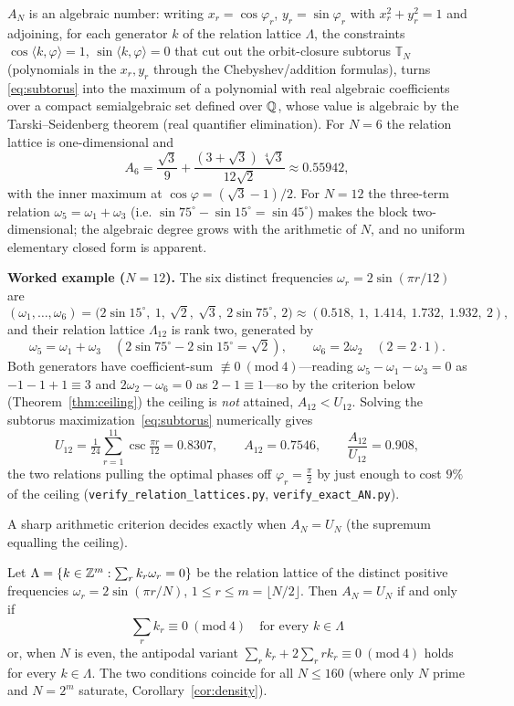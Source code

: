 \begin{proposition}\label{prop:closed}
$A_N$ is an algebraic number: writing $x_r=\cos\varphi_r$, $y_r=\sin\varphi_r$ with $x_r^2+y_r^2=1$ and
adjoining, for each generator $k$ of the relation lattice $\Lambda$, the constraints
$\cos\langle k,\varphi\rangle=1$, $\sin\langle k,\varphi\rangle=0$ that cut out the orbit-closure subtorus
$\mathbb{T}_N$ (polynomials in the $x_r,y_r$ through the Chebyshev/addition formulas), turns
\eqref{eq:subtorus} into the maximum of a polynomial with real algebraic coefficients over a compact
semialgebraic set defined over $\mathbb{Q}$, whose value is algebraic by the Tarski--Seidenberg theorem (real quantifier elimination). For $N=6$ the relation lattice is one-dimensional and
\[
  A_6=\frac{\sqrt3}{9}+\frac{(3+\sqrt3)\,\sqrt[4]{3}}{12\sqrt2}\approx0.55942 ,
\]
with the inner maximum at $\cos\varphi=(\sqrt3-1)/2$. For $N=12$ the three-term relation
$\omega_5=\omega_1+\omega_3$ (i.e. $\sin75^\circ-\sin15^\circ=\sin45^\circ$) makes the block
two-dimensional; the algebraic degree grows with the arithmetic of $N$, and no uniform elementary
closed form is apparent.
\end{proposition}

\medskip\noindent\textbf{Worked example ($N=12$).} The six distinct frequencies $\omega_r=2\sin(\pi r/12)$
are
\[
  (\omega_1,\dots,\omega_6)=\bigl(2\sin15^\circ,\ 1,\ \sqrt2,\ \sqrt3,\ 2\sin75^\circ,\ 2\bigr)
  \approx(0.518,\ 1,\ 1.414,\ 1.732,\ 1.932,\ 2),
\]
and their relation lattice $\Lambda_{12}$ is rank two, generated by
\[
  \omega_5=\omega_1+\omega_3\quad(2\sin75^\circ-2\sin15^\circ=\sqrt2),\qquad
  \omega_6=2\omega_2\quad(2=2\cdot1).
\]
Both generators have coefficient-sum $\not\equiv0\ (\mathrm{mod}\ 4)$---reading
$\omega_5-\omega_1-\omega_3=0$ as $-1-1+1\equiv3$ and $2\omega_2-\omega_6=0$ as $2-1\equiv1$---so by the
criterion below (Theorem~\ref{thm:ceiling}) the ceiling is \emph{not} attained, $A_{12}<U_{12}$. Solving
the subtorus maximization~\eqref{eq:subtorus} numerically gives
\[
  U_{12}=\tfrac1{24}\sum_{r=1}^{11}\csc\tfrac{\pi r}{12}=0.8307,\qquad A_{12}=0.7546,\qquad
  \frac{A_{12}}{U_{12}}=0.908 ,
\]
the two relations pulling the optimal phases off $\varphi_r=\tfrac\pi2$ by just enough to cost $9\%$ of the
ceiling (\texttt{verify\_relation\_lattices.py}, \texttt{verify\_exact\_AN.py}).

A sharp arithmetic criterion decides exactly when $A_N=U_N$ (the supremum equalling the ceiling).

\begin{theorem}\label{thm:ceiling}
Let $\Lambda=\{k\in\mathbb{Z}^m:\sum_r k_r\omega_r=0\}$ be the relation lattice of the distinct positive
frequencies $\omega_r=2\sin(\pi r/N)$, $1\le r\le m=\lfloor N/2\rfloor$. Then $A_N=U_N$ if and only if
\[
  \sum_{r}k_r\equiv0\ (\mathrm{mod}\ 4)\quad\text{for every }k\in\Lambda
\]
or, when $N$ is even, the antipodal variant $\sum_r k_r+2\sum_r rk_r\equiv0\ (\mathrm{mod}\ 4)$ holds for
every $k\in\Lambda$. The two conditions coincide for all $N\le160$ (where only $N$ prime and $N=2^m$
saturate, Corollary~\ref{cor:density}).
\end{theorem}

